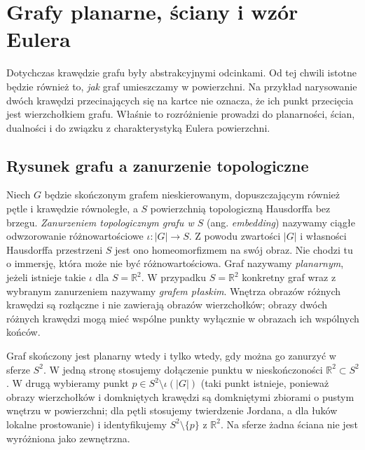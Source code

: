 \chapter{Grafy planarne, ściany i wzór Eulera}
\label{ch:tg-planarne}

Dotychczas krawędzie grafu były abstrakcyjnymi odcinkami. Od tej chwili
istotne będzie również to, \emph{jak} graf umieszczamy w powierzchni.
Na przykład narysowanie dwóch krawędzi przecinających się na kartce
nie oznacza, że ich punkt przecięcia jest wierzchołkiem grafu.
Właśnie to rozróżnienie prowadzi do planarności, ścian, dualności
i do związku z charakterystyką Eulera powierzchni.

\section{Rysunek grafu a zanurzenie topologiczne}
\label{sec:tg-osadzanie-planarne}

\begin{definicja}
Niech $G$ będzie skończonym grafem nieskierowanym,
dopuszczającym również pętle i krawędzie równoległe,
a $S$ powierzchnią topologiczną Hausdorffa bez brzegu.
\emph{Zanurzeniem topologicznym grafu w $S$} (ang. \emph{embedding})
nazywamy ciągłe odwzorowanie różnowartościowe $\iota:|G|\to S$.
Z powodu zwartości $|G|$ i własności Hausdorffa przestrzeni $S$
jest ono homeomorfizmem na swój obraz.
Nie chodzi tu o immersję, która może nie być
różnowartościowa. Graf nazywamy \emph{planarnym},
jeżeli istnieje takie $\iota$ dla $S=\mathbb R^2$.
W przypadku $S=\mathbb R^2$ konkretny graf wraz z wybranym
zanurzeniem nazywamy \emph{grafem płaskim}. Wnętrza obrazów różnych
krawędzi są rozłączne i nie zawierają obrazów wierzchołków;
obrazy dwóch różnych krawędzi mogą mieć wspólne punkty
wyłącznie w obrazach ich wspólnych końców.
\end{definicja}

\begin{uwaga}
Graf skończony jest planarny wtedy i tylko wtedy, gdy można go
zanurzyć w sferze $S^2$. W jedną stronę stosujemy dołączenie
punktu w nieskończoności $\mathbb R^2\subset S^2$.
W drugą wybieramy punkt $p\in S^2\setminus\iota(|G|)$
(taki punkt istnieje, ponieważ obrazy wierzchołków
i domkniętych krawędzi są domkniętymi zbiorami
o pustym wnętrzu w powierzchni; dla pętli stosujemy
twierdzenie Jordana, a dla łuków lokalne prostowanie) 
i identyfikujemy $S^2\setminus\{p\}$ z $\mathbb R^2$.
Na sferze żadna ściana nie jest wyróżniona jako zewnętrzna.
\end{uwaga}

